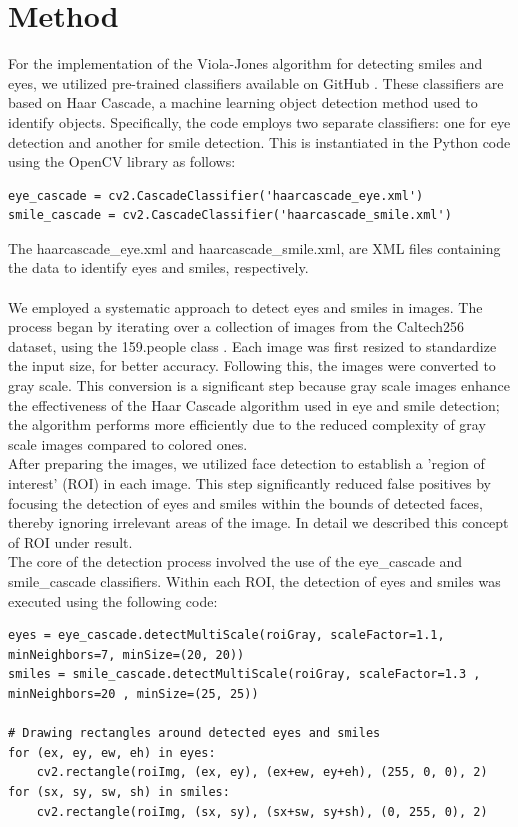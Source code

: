 \documentclass[11pt, a4paper, twocolumn]{article}
\begin{document}
\section*{Method}
For the implementation of the Viola-Jones algorithm for detecting smiles and eyes, we utilized pre-trained classifiers available on GitHub \cite{OpencvDataHaarcascades}. These classifiers are based on Haar Cascade, a machine learning object detection method used to identify objects. Specifically, the code employs two separate classifiers: one for eye detection and another for smile detection. This is instantiated in the Python code using the OpenCV library as follows:
\begin{lstlisting}
eye_cascade = cv2.CascadeClassifier('haarcascade_eye.xml')
smile_cascade = cv2.CascadeClassifier('haarcascade_smile.xml')
\end{lstlisting}
The haarcascade\_eye.xml and haarcascade\_smile.xml, are XML files containing the data to identify eyes and smiles, respectively. \\\\
We employed a systematic approach to detect eyes and smiles in images. The process began by iterating over a collection of images  from the Caltech256 dataset, using the 159.people class \cite{CaltechDatasetImages}. Each image was first resized to standardize the input size, for better accuracy. Following this, the images were converted to gray scale. This conversion is a significant step because gray scale images enhance the effectiveness of the Haar Cascade algorithm used in eye and smile detection; the algorithm performs more efficiently due to the reduced complexity of gray scale images compared to colored ones.\\
After preparing the images, we utilized face detection to establish a 'region of interest' (ROI) in each image. This step significantly reduced false positives by focusing the detection of eyes and smiles within the bounds of detected faces, thereby ignoring irrelevant areas of the image. In detail we described this concept of ROI under result. \\
The core of the detection process involved the use of the eye\_cascade and smile\_cascade classifiers. Within each ROI, the detection of eyes and smiles was executed using the following code:
\begin{lstlisting}
eyes = eye_cascade.detectMultiScale(roiGray, scaleFactor=1.1, minNeighbors=7, minSize=(20, 20)) 
smiles = smile_cascade.detectMultiScale(roiGray, scaleFactor=1.3 , minNeighbors=20 , minSize=(25, 25))

# Drawing rectangles around detected eyes and smiles
for (ex, ey, ew, eh) in eyes:
    cv2.rectangle(roiImg, (ex, ey), (ex+ew, ey+eh), (255, 0, 0), 2)
for (sx, sy, sw, sh) in smiles:
    cv2.rectangle(roiImg, (sx, sy), (sx+sw, sy+sh), (0, 255, 0), 2)
\end{lstlisting}
\end{document}
